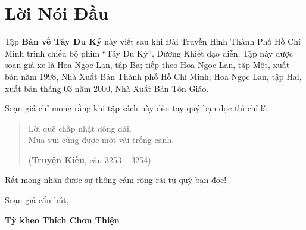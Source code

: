 \chapter*{Lời Nói Đầu} %
\label{cha:loi_noi_dau}

Tập {\bf Bàn về Tây Du Ký} này viết sau khi Đài Truyền Hình Thành Phố Hồ Chí Minh trình chiếu bộ phim ``Tây Du Ký'', Dương Khiết đạo diễn. Tập này được soạn giả xe là Hoa Ngọc Lan, tập Ba; tiếp theo Hoa Ngọc Lan, tập Một, xuất bản năm 1998, Nhà Xuất Bản Thành phố Hồ Chí Minh; Hoa Ngọc Lan, tập Hai, xuất bản tháng 03 năm 2000, Nhà Xuất Bản Tôn Giáo.

Soạn giả chỉ mong rằng khi tập sách này đến tay quý bạn đọc thì chỉ là:

\begin{verse}
\begin{itshape}
Lời quê chắp nhặt dông dài,\\
Mua vui cũng được một vài trống canh.
\end{itshape}

\hfill
({\bf Truyện Kiều}, câu 3253 -- 3254)
\end{verse}
Rất mong nhận được sự thông cảm rộng rãi từ quý bạn đọc!

\vfill
\hfill
\begin{minipage}{0.6\textwidth}
\begin{center}
Soạn giả cẩn bút,

{\bf Tỳ kheo Thích Chơn Thiện}
\end{center}
\end{minipage}
\vfill
